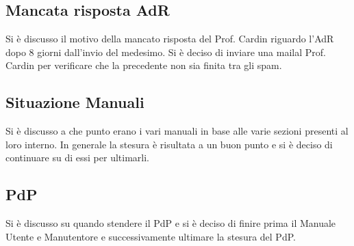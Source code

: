 \subsection*{Mancata risposta AdR}
Si è discusso il motivo della mancato risposta del Prof. Cardin riguardo l'AdR dopo 8 giorni dall'invio del medesimo.
Si è deciso di inviare una mailal Prof. Cardin per verificare che la precedente non sia finita tra gli spam.
\subsection*{Situazione Manuali}
Si è discusso a che punto erano i vari manuali in base alle varie sezioni presenti al loro interno. In generale la stesura è risultata a un buon punto e si è deciso di continuare su di essi per ultimarli.
\subsection*{PdP}
Si è discusso su quando stendere il PdP e si è deciso di finire prima il Manuale Utente e Manutentore e successivamente ultimare la stesura del PdP.

